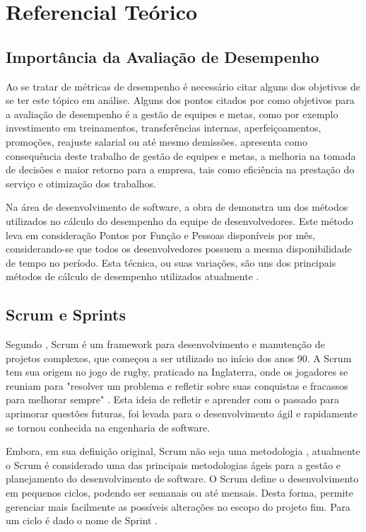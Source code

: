 \section{Referencial Teórico}

\subsection{ Importância da Avaliação de Desempenho}
Ao se tratar de métricas de desempenho é necessário citar alguns dos objetivos de se ter este tópico em análise. Alguns dos pontos citados por  como objetivos para a avaliação de desempenho é a gestão de equipes e metas, como por exemplo investimento em treinamentos, transferências internas, aperfeiçoamentos, promoções, reajuste salarial ou até mesmo demissões.  apresenta como consequência deste trabalho de gestão de equipes e metas, a melhoria na tomada de decisões e maior retorno para a empresa, tais como eficiência na prestação do serviço e otimização dos trabalhos.\par
Na área de desenvolvimento de software, a obra de  demonstra um dos métodos utilizados no cálculo do desempenho da equipe de desenvolvedores. Este método leva em consideração Pontos por Função e Pessoas disponíveis por mês, considerando-se que todos os desenvolvedores possuem a mesma disponibilidade de tempo no período. Esta técnica, ou suas variações, são uns dos principais métodos de cálculo de desempenho utilizados atualmente \cite{barbaran1998indicadores}.

\subsection{Scrum e Sprints}
Segundo \citeauthor{scrumguide}, Scrum é um framework para desenvolvimento e manutenção de projetos complexos, que começou a ser utilizado no início dos anos 90. A Scrum tem sua origem no jogo de rugby, praticado na Inglaterra, onde os jogadores se reuniam para "resolver um problema e refletir sobre suas conquistas e fracassos para melhorar sempre" \cite{scrumatlassian}. Esta ideia de refletir e aprender com o passado para aprimorar questões futuras, foi levada para o desenvolvimento ágil e rapidamente se tornou conhecida na engenharia de software.\par 

Embora, em sua definição original, Scrum não seja uma metodologia \cite{scrumguide}, atualmente o Scrum é considerado uma das principais metodologias ágeis para a gestão e planejamento do desenvolvimento de software. O Scrum define o desenvolvimento em pequenos ciclos, podendo ser semanais ou até mensais. Desta forma, permite gerenciar mais facilmente as possíveis alterações no escopo do projeto fim. Para um ciclo é dado o nome de Sprint \cite{scrum}.\par

